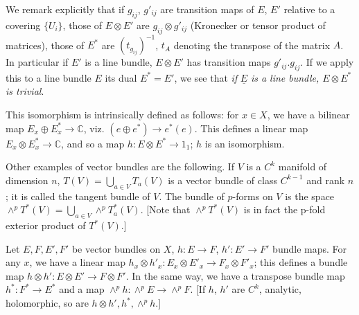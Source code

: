 We remark explicitly that if $g_{ij}$, $g'_{ij}$ are transition maps
of $E$, $E'$ relative to a covering $\{ U_i \}$, those of $E \otimes
E'$ are $g_{ij} \otimes g'_{ij}$ (Kronecker or tensor product of
matrices), those of $E^*$ are $(t_{g_{ij}})^{-1}$, $t_A$ denoting the
transpose of the matrix $A$.  In particular if $E'$ is a line bundle,
$E \otimes E'$ has transition maps $g'_{ij}.g_{ij}$. If we apply this
to a line bundle $E$ its dual $E^*=E'$, we see that \textit{if}
$\underline{E}$ \textit{is a line bundle, $E \otimes E^*$ is
  trivial}. 

This isomorphism is intrinsically defined as follows: for $x \in X$,
we have a bilinear map $E_x \oplus E^*_x \to \mathbb{C}$, viz. $(e
\oplus e^*) \to e^* (e)$. This defines a linear map $E_x \otimes E^*_x
\to \mathbb{C}$, and so a map $h: E \otimes E^* \to 1_1$; $h$ is an
isomorphism. 

Other examples of vector bundles are the following. If $V$ is a
$C^k$ manifold of dimension $n$, $T(V)= \bigcup\limits_{a \in V} T_a (V)$ is a
vector bundle of class 
$C^{k-1}$ and rank $n$; it is called the tangent bundle of $V$. The
bundle of $p$-forms on $V$ is the space $\wedge^p T^* (V)= \bigcup
\limits_{a \in V}\wedge^p T^*_a (V)$. [Note that $\wedge^p T^*(V)$ is in
  fact the p-fold exterior product of $T^* (V)$.] 

Let $E,F,E',F'$ be vector bundles on $X$, $h:E \to F$, $h' :E' \to F'$
bundle maps. For any $x$, we have a linear map $h_x \otimes h'_x:E_x
\otimes E'_x \to F_x \otimes F'_x$; this defines a bundle map $h
\otimes h' : E \otimes E' \to F \otimes F'$. In the same way, we
have a transpose bundle map $h^* : F^* \to E^*$ and a map $\wedge^p 
h : \wedge^p E \to \wedge^p F$. [If $h$, $h'$ are $C^k$, analytic,
  holomorphic, so are $h \otimes h',h^*,\wedge^p h$.] 

